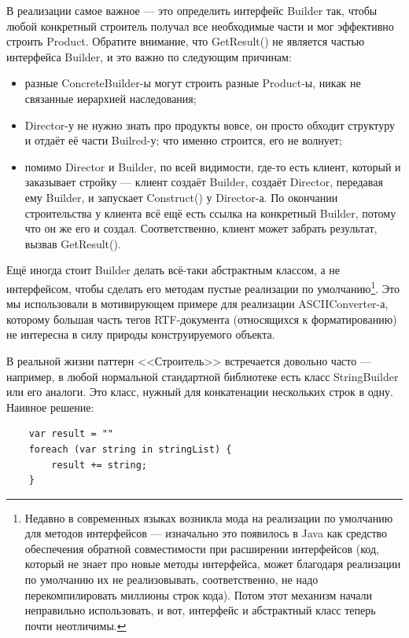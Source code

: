 \documentclass{../../text-style}
\begin{document}
В реализации самое важное --- это определить интерфейс Builder так, чтобы любой конкретный строитель получал все необходимые части и мог эффективно строить Product. Обратите внимание, что GetResult() не является частью интерфейса Builder, и это важно по следующим причинам:

\begin{itemize}
    \item разные ConcreteBuilder-ы могут строить разные Product-ы, никак не связанные иерархией наследования;
    \item Director-у не нужно знать про продукты вовсе, он просто обходит структуру и отдаёт её части Builred-у; что именно строится, его не волнует;
    \item помимо Director и Builder, по всей видимости, где-то есть клиент, который и заказывает стройку --- клиент создаёт Builder, создаёт Director, передавая ему Builder, и запускает Construct() у Director-а. По окончании строительства у клиента всё ещё есть ссылка на конкретный Builder, потому что он же его и создал. Соответственно, клиент может забрать результат, вызвав GetResult().
\end{itemize}

Ещё иногда стоит Builder делать всё-таки абстрактным классом, а не интерфейсом, чтобы сделать его методам пустые реализации по умолчанию\footnote{Недавно в современных языках возникла мода на реализации по умолчанию для методов интерфейсов --- изначально это появилось в Java как средство обеспечения обратной совместимости при расширении интерфейсов (код, который не знает про новые методы интерфейса, может благодаря реализации по умолчанию их не реализовывать, соответственно, не надо перекомпилировать миллионы строк кода). Потом этот механизм начали неправильно использовать, и вот, интерфейс и абстрактный класс теперь почти неотличимы.}. Это мы использовали в мотивирующем примере для реализации ASCIIConverter-а, которому большая часть тегов RTF-документа (относящихся к форматированию) не интересна в силу природы конструируемого объекта.

В реальной жизни паттерн <<Строитель>> встречается довольно часто --- например, в любой нормальной стандартной библиотеке есть класс StringBuilder или его аналоги. Это класс, нужный для конкатенации нескольких строк в одну. Наивное решение:

\begin{verbatim}
    var result = ""
    foreach (var string in stringList) {
        result += string;
    }
\end{verbatim}
\end{document}
